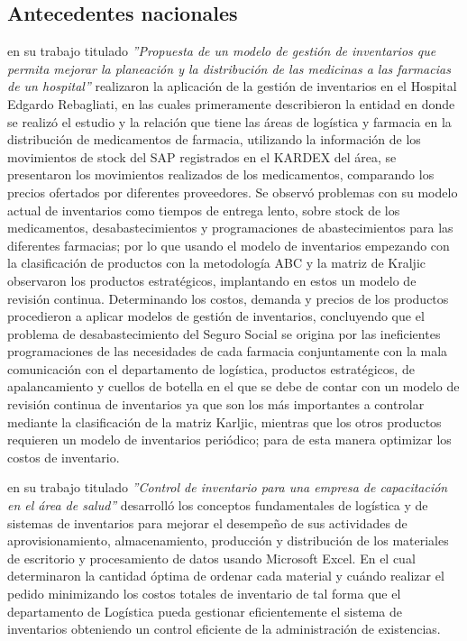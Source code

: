 \subsection{Antecedentes nacionales}
\cite{caceres2010propuesta} en su trabajo titulado \textsl{''Propuesta de un modelo de gestión de inventarios que permita mejorar la planeación y la distribución de las medicinas a las farmacias de un hospital''} realizaron la aplicación de la gestión de inventarios en el Hospital Edgardo Rebagliati, en las cuales primeramente describieron la entidad en donde se realizó el estudio y la relación que tiene las áreas de logística y farmacia en la distribución de medicamentos de farmacia, utilizando la información de los movimientos de stock del SAP registrados en el KARDEX del área, se presentaron los movimientos realizados de los medicamentos, comparando los precios ofertados por diferentes proveedores. Se observó problemas con su modelo actual de inventarios como tiempos de entrega lento, sobre stock de los medicamentos, desabastecimientos y programaciones de abastecimientos para las diferentes farmacias; por lo que usando el modelo de inventarios empezando con la clasificación de productos con la metodología ABC y la matriz de Kraljic observaron los productos estratégicos, implantando en estos un modelo de revisión continua. Determinando los costos, demanda y precios de los productos procedieron a aplicar modelos de gestión de inventarios, concluyendo que el problema de desabastecimiento del Seguro Social se origina por las ineficientes programaciones de las necesidades de cada farmacia conjuntamente con la mala comunicación con el departamento de logística, productos estratégicos, de apalancamiento y cuellos de botella en el que se debe de contar con un modelo de revisión continua de inventarios ya que son los más importantes a controlar mediante la clasificación de la matriz Karljic, mientras que los otros productos requieren un modelo de inventarios periódico; para de esta manera optimizar los costos de inventario.

\cite{caballero2007control} en su trabajo titulado \textsl{''Control de inventario para una empresa de capacitación en el área de salud''} desarrolló los conceptos fundamentales de logística y de sistemas de inventarios para mejorar el desempeño de sus actividades de aprovisionamiento, almacenamiento, producción y distribución de los materiales de escritorio y procesamiento de datos usando Microsoft Excel. En el cual determinaron la cantidad óptima de ordenar cada material y cuándo realizar el pedido minimizando los costos totales de inventario de tal forma que el departamento de Logística pueda gestionar eficientemente el sistema de inventarios obteniendo un control eficiente de la administración de existencias.
